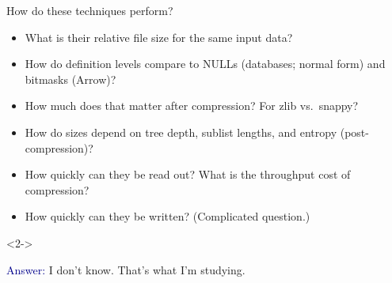 \documentclass{beamer}
\begin{document}

\begin{frame}{How do these techniques perform?}
\vspace{0.5 cm}
\begin{itemize}
\item What is their relative file size for the same input data?
\item How do definition levels compare to NULLs (databases; normal form) and bitmasks (Arrow)?
\item How much does that matter after compression? For zlib vs.\ snappy?
\item How do sizes depend on tree depth, sublist lengths, and entropy (post-compression)?
\item How quickly can they be read out? What is the throughput cost of compression?
\item How quickly can they be written? (Complicated question.)
\end{itemize}
\begin{uncoverenv}<2->
\begin{center}
\Large \textcolor{darkblue}{Answer:} I don't know. That's what I'm studying.
\end{center}
\end{uncoverenv}
\end{frame}
\end{document}
